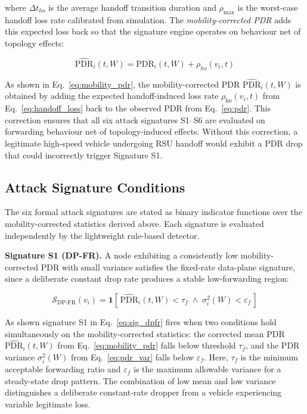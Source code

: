 \documentclass[12pt, a4paper]{report}
\begin{document}
\noindent where $\Delta t_{ho}$ is the average handoff transition duration and
$\rho_{\max}$ is the worst-case handoff loss rate calibrated from simulation.
The \emph{mobility-corrected PDR} adds this expected loss back so that the
signature engine operates on behaviour net of topology effects:

\begin{equation}
\label{eq:mobility_pdr}
\widehat{\text{PDR}}_i(t, W) = \text{PDR}_i(t, W) + \rho_{ho}(v_i, t)
\end{equation}

As shown in Eq.~\eqref{eq:mobility_pdr}, the mobility-corrected PDR $\widehat{\text{PDR}}_i(t, W)$ is obtained by adding the expected handoff-induced loss rate $\rho_{\text{ho}}(v_i, t)$ from Eq.~\eqref{eq:handoff_loss} back to the observed PDR from Eq.~\eqref{eq:pdr}. This correction ensures that all six attack signatures S1--S6 are evaluated on forwarding behaviour net of topology-induced effects. Without this correction, a legitimate high-speed vehicle undergoing RSU handoff would exhibit a PDR drop that could incorrectly trigger Signature S1.

\subsection{Attack Signature Conditions}
\label{sec:signatures}

The six formal attack signatures are stated as binary indicator functions
over the mobility-corrected statistics derived above. Each signature is
evaluated independently by the lightweight rule-based detector.

\textbf{Signature S1 (DP-FR).} A node exhibiting a consistently low
mobility-corrected PDR with small variance satisfies the fixed-rate data-plane
signature, since a deliberate constant drop rate produces a stable
low-forwarding region:

\begin{equation}
\label{eq:sig_dpfr}
\mathcal{S}_{\text{DP-FR}}(v_i) =
\mathbf{1}\!\left[\,
\widehat{\text{PDR}}_i(t, W) < \tau_f \;\wedge\;
\sigma^2_i(W) < \varepsilon_f
\,\right]
\end{equation}

As shown signature S1 in Eq.~\eqref{eq:sig_dpfr} fires when two conditions hold simultaneously on the mobility-corrected statistics: the corrected mean PDR $\widehat{\text{PDR}}_i(t, W)$ from Eq.~\eqref{eq:mobility_pdr} falls below threshold $\tau_f$, and the PDR variance $\sigma_i^2(W)$ from Eq.~\eqref{eq:pdr_var} falls below $\varepsilon_f$. Here, $\tau_f$ is the minimum acceptable forwarding ratio and $\varepsilon_f$ is the maximum allowable variance for a steady-state drop pattern. The combination of low mean and low variance distinguishes a deliberate constant-rate dropper from a vehicle experiencing variable legitimate loss.
\end{document}
